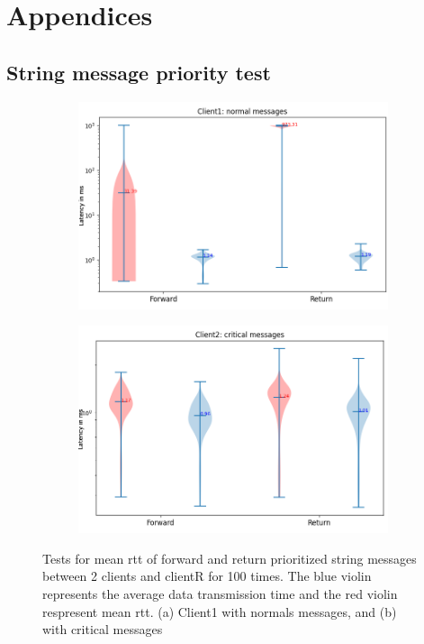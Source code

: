 \chapter{Appendices}\label{chap: append}
\section{String message priority test}%
%
%
\begin{figure}[htb]
    \centering
    \begin{subfigure}[b]{0.99\textwidth}
    \includegraphics[width=\textwidth]{figures/appendix/priority_tests/log_violin_2clients_string_priority_client1.png}\hfill 
    \caption{} \label{fig: priority-2clients-string-1}
    \end{subfigure}
    \begin{subfigure}[b]{0.99\textwidth}
        \includegraphics[width=\textwidth]{figures/appendix/priority_tests/log_violin_2clients_string_priority_client2.png}\hfill 
        \caption{} \label{fig: priority-2clients-string-2}
    \end{subfigure}
    
    
    \caption{Tests for mean \gls{rtt} of forward and return prioritized string messages between 2 clients 
    and clientR for 100 times. The blue violin represents the average data transmission time and the red violin 
    respresent mean \gls{rtt}. (a) Client1 with normals messages, and (b) 
    with critical messages} \label{fig: priority-2clients-string}
\end{figure}



